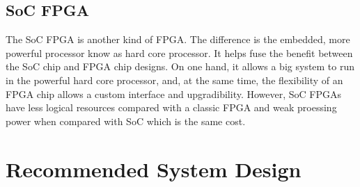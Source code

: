 \documentclass[12pt,article]{memoir}
\begin{document}
\section{SoC FPGA}
The SoC FPGA is another kind of FPGA. The difference is the embedded, more powerful processor know as hard core processor. It helps fuse the benefit between the SoC chip and FPGA chip designs. On one hand, it allows a big system to run in the powerful hard core processor, and, at the same time, the flexibility of an FPGA chip allows a custom interface and upgradibility. However, SoC FPGAs have less logical resources compared with a classic FPGA and weak proessing power when compared with SoC which is the same cost.
\newpage
\chapter{Recommended System Design}
\end{document}
